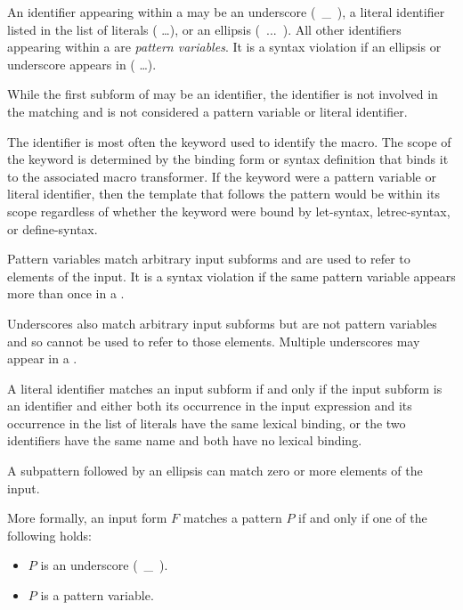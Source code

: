 \begin{entry}{%
}
An identifier appearing within a  may be an underscore
(~{\cf \_}~), a literal identifier listed in the list of literals
{\cf ( \dots)}, or an ellipsis (~{\cf ...}~).
All other identifiers appearing within a  are
\textit{pattern variables}.
It is a syntax violation if an ellipsis or underscore appears in {\cf ( \dots)}.

While the first subform of  may be an identifier, the
identifier is not involved in the matching and
is not considered a pattern variable or literal identifier.

\begin{rationale}
The identifier is most often the keyword used to identify the macro.
The scope of the keyword is determined by the binding form or syntax
definition that binds it to the associated macro transformer.
If the keyword were a pattern variable or literal
identifier, then
the template that follows the pattern would be within its scope
regardless of whether the keyword were bound by {\cf let-syntax},
{\cf letrec-syntax}, or {\cf define-syntax}.
\end{rationale}

Pattern variables match arbitrary input subforms and
are used to refer to elements of the input.
It is a syntax violation if the same pattern variable appears more than once in a
.

Underscores also match arbitrary input subforms but are not pattern variables
and so cannot be used to refer to those elements.
Multiple underscores may appear in a .

A literal identifier matches an input subform if and only if the input
subform is an identifier and either both its occurrence in the input
expression and its occurrence in the list of literals have the same
lexical binding, or the two identifiers have the same name and both have
no lexical binding.

A subpattern followed by an ellipsis can match zero or more elements of
the input.

More formally, an input form $F$ matches a pattern $P$ if and only if
one of the following holds:

\begin{itemize}
\item $P$ is an underscore (~{\cf \_}~).

\item $P$ is a pattern variable.


\end{itemize}
\end{entry}
